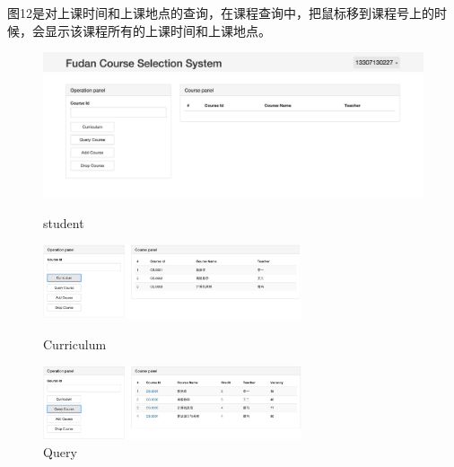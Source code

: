 \documentclass[a4paper, 11pt, nofonts, nocap, fancyhdr]{ctexart}
\begin{document}
	图12是对上课时间和上课地点的查询，在课程查询中，把鼠标移到课程号上的时候，会显示该课程所有的上课时间和上课地点。

	
	\begin{figure}[ht]

		\centering
		\includegraphics[width=6in]{student}
		\caption{student}

		\vspace{0.8cm}

		\begin{minipage}{0.5\textwidth}
			\centering
			\includegraphics[width=3in]{curriculum}
			\caption{Curriculum}
		\end{minipage}%
		\begin{minipage}{0.5\textwidth}
			\centering
			\includegraphics[width=3in]{query}
			\caption{Query}
		\end{minipage}
	\end{figure}
	\vspace{0.8cm}
\end{document}
